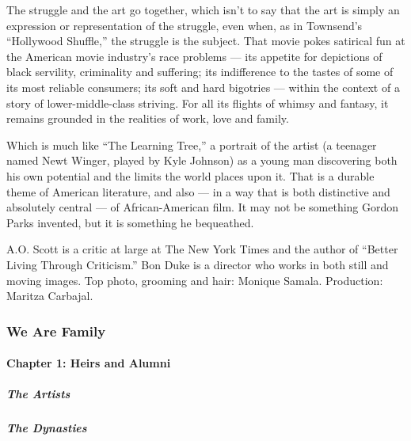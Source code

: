 The struggle and the art go together, which isn't to say that the art is
simply an expression or representation of the struggle, even when, as in
Townsend's ``Hollywood Shuffle,'' the struggle is the subject. That
movie pokes satirical fun at the American movie industry's race problems
--- its appetite for depictions of black servility, criminality and
suffering; its indifference to the tastes of some of its most reliable
consumers; its soft and hard bigotries --- within the context of a story
of lower-middle-class striving. For all its flights of whimsy and
fantasy, it remains grounded in the realities of work, love and family.

Which is much like ``The Learning Tree,'' a portrait of the artist (a
teenager named Newt Winger, played by Kyle Johnson) as a young man
discovering both his own potential and the limits the world places upon
it. That is a durable theme of American literature, and also --- in a
way that is both distinctive and absolutely central --- of
African-American film. It may not be something Gordon Parks invented,
but it is something he bequeathed.

A.O. Scott is a critic at large at The New York Times and the author of
``Better Living Through Criticism.'' Bon Duke is a director who works in
both still and moving images. Top photo, grooming and hair: Monique
Samala. Production: Maritza Carbajal.

\hypertarget{we-are-family-1}{%
\subsubsection{We Are Family}\label{we-are-family-1}}

\hypertarget{chapter-1-heirs-and-alumni-1}{%
\paragraph{Chapter 1: Heirs and
Alumni}\label{chapter-1-heirs-and-alumni-1}}

\href{/interactive/2020/04/13/t-magazine/black-art-galleries.html}{}

\hypertarget{the-artists}{%
\subparagraph{The Artists}\label{the-artists}}

\href{/interactive/2020/04/13/t-magazine/italian-fashion-design-houses.html}{}

\hypertarget{the-dynasties}{%
\subparagraph{The Dynasties}\label{the-dynasties}}

\href{/interactive/2020/04/13/t-magazine/gordon-parks.html}{}

